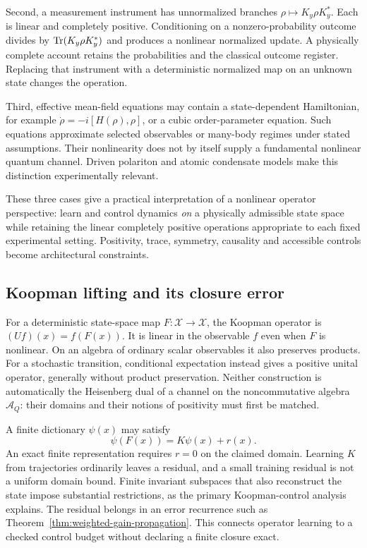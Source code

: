 Second, a measurement instrument has unnormalized branches
$\rho\mapsto K_y\rho K_y^*$. Each is linear and completely positive.
Conditioning on a nonzero-probability outcome divides by
$\operatorname{Tr}(K_y\rho K_y^*)$ and produces a nonlinear normalized update. A
physically complete account retains the probabilities and the classical
outcome register. Replacing that instrument with a deterministic normalized
map on an unknown state changes the operation.

Third, effective mean-field equations may contain a state-dependent
Hamiltonian, for example $\dot\rho=-i[H(\rho),\rho]$, or a cubic
order-parameter equation. Such equations approximate selected observables
or many-body regimes under stated assumptions. Their nonlinearity does not
by itself supply a fundamental nonlinear quantum channel. Driven polariton
and atomic condensate models make this distinction experimentally relevant.
\cite{qtsCarusottoCiuti2013,qtsBarontini2013}

These three cases give a practical interpretation of a nonlinear operator
perspective: learn and control dynamics \emph{on} a physically admissible
state space while retaining the linear completely positive operations
appropriate to each fixed experimental setting. Positivity, trace, symmetry,
causality and accessible controls become architectural constraints.

\subsection{Koopman lifting and its closure error}

For a deterministic state-space map $F:\mathcal X\to\mathcal X$, the
Koopman operator is $(Uf)(x)=f(F(x))$. It is linear in the observable $f$
even when $F$ is nonlinear. On an algebra of ordinary scalar observables it
also preserves products. For a stochastic transition, conditional
expectation instead gives a positive unital operator, generally without
product preservation. Neither construction is automatically the
Heisenberg dual of a channel on the noncommutative algebra $\mathcal A_Q$:
their domains and their notions of positivity must first be matched.

A finite dictionary $\psi(x)$ may satisfy
\[
 \psi(F(x))=K\psi(x)+r(x).
\]
An exact finite representation requires $r=0$ on the claimed domain.
Learning $K$ from trajectories ordinarily leaves a residual, and a small
training residual is not a uniform domain bound. Finite invariant
subspaces that also reconstruct the state impose substantial restrictions,
as the primary Koopman-control analysis explains.\cite{qtsBrunton2016}
The residual belongs in an error recurrence such as
Theorem~\ref{thm:weighted-gain-propagation}. This connects operator learning
to a checked control budget without declaring a finite closure exact.

